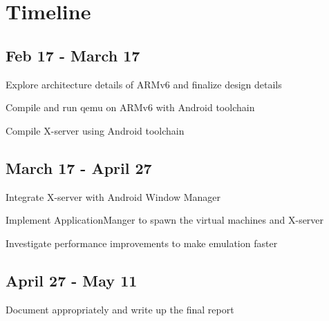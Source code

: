 \section{Timeline}
\subsection{Feb 17 - March 17}
	\begin{itemize*}
	\item Explore architecture details of ARMv6 and finalize design details
	\item Compile and run qemu on ARMv6 with Android toolchain
	\item Compile X-server using Android toolchain 
	\end{itemize*}
\subsection{March 17 - April 27}
	\begin{itemize*}
	\item Integrate X-server with Android Window Manager
	\item Implement ApplicationManger to spawn the virtual machines and X-server 
	\item Investigate performance improvements to make emulation faster
	\end{itemize*}
\subsection{April 27 - May 11}
	\begin{itemize*}
	\item Document appropriately and write up the final report 
	\end{itemize*}
